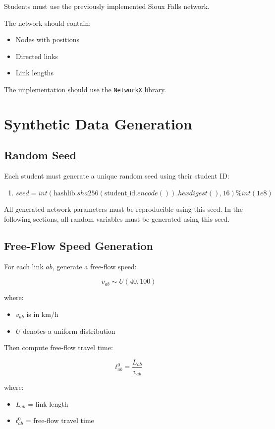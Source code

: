\documentclass{rapportCS} %
\begin{document}
Students must use the previously implemented Sioux Falls network.

The network should contain:

\begin{itemize}
    \item Nodes with positions
    \item Directed links
    \item Link lengths
\end{itemize}

The implementation should use the \texttt{NetworkX} library.

\section{Synthetic Data Generation}
\subsection{Random Seed}

Each student must generate a unique random seed using their student ID:

\begin{enumerate}
    \item[] \( seed = int(\text{hashlib}.sha256(\text{student\_id}.encode()).hexdigest(), 16) \% int(1e8) \)
\end{enumerate}
All generated network parameters must be reproducible using this seed. In the following sections, all random variables must be generated using this seed.

\subsection{Free-Flow Speed Generation}

For each link \(ab\), generate a free-flow speed:

\[
v_{ab} \sim U(40,100)
\]

where:
\begin{itemize}
    \item \(v_{ab}\) is in km/h
    \item \(U\) denotes a uniform distribution
\end{itemize}

Then compute free-flow travel time:

\[
t_{ab}^0 = \frac{L_{ab}}{v_{ab}}
\]

where:
\begin{itemize}
    \item \(L_{ab}\) = link length
    \item \(t_{ab}^0\) = free-flow travel time
\end{itemize}
\end{document}
